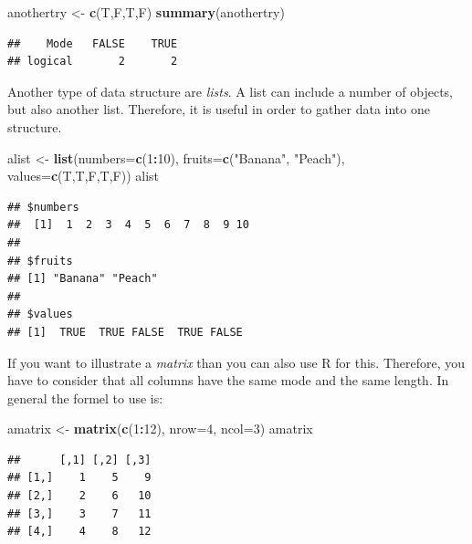 \documentclass[]{report}
\newenvironment{Shaded}{\begin{snugshade}}{\end{snugshade}}
\newcommand{\KeywordTok}[1]{\textcolor[rgb]{0.13,0.29,0.53}{\textbf{#1}}}
\newcommand{\DataTypeTok}[1]{\textcolor[rgb]{0.13,0.29,0.53}{#1}}
\newcommand{\DecValTok}[1]{\textcolor[rgb]{0.00,0.00,0.81}{#1}}
\newcommand{\StringTok}[1]{\textcolor[rgb]{0.31,0.60,0.02}{#1}}
\newcommand{\OperatorTok}[1]{\textcolor[rgb]{0.81,0.36,0.00}{\textbf{#1}}}
\newcommand{\NormalTok}[1]{#1}
\begin{document}
\begin{Shaded}
\begin{Highlighting}[]
\NormalTok{anothertry <-}\StringTok{ }\KeywordTok{c}\NormalTok{(T,F,T,F)  }
\KeywordTok{summary}\NormalTok{(anothertry)}
\end{Highlighting}
\end{Shaded}

\begin{verbatim}
##    Mode   FALSE    TRUE 
## logical       2       2
\end{verbatim}

Another type of data structure are \emph{lists}. A list can include a
number of objects, but also another list. Therefore, it is useful in
order to gather data into one structure.

\begin{Shaded}
\begin{Highlighting}[]
\NormalTok{alist <-}\StringTok{ }\KeywordTok{list}\NormalTok{(}\DataTypeTok{numbers=}\KeywordTok{c}\NormalTok{(}\DecValTok{1}\OperatorTok{:}\DecValTok{10}\NormalTok{),}
      \DataTypeTok{fruits=}\KeywordTok{c}\NormalTok{(}\StringTok{"Banana"}\NormalTok{, }\StringTok{"Peach"}\NormalTok{),}
      \DataTypeTok{values=}\KeywordTok{c}\NormalTok{(T,T,F,T,F))}
\NormalTok{alist}
\end{Highlighting}
\end{Shaded}

\begin{verbatim}
## $numbers
##  [1]  1  2  3  4  5  6  7  8  9 10
## 
## $fruits
## [1] "Banana" "Peach" 
## 
## $values
## [1]  TRUE  TRUE FALSE  TRUE FALSE
\end{verbatim}

If you want to illustrate a \emph{matrix} than you can also use R for
this. Therefore, you have to consider that all columns have the same
mode and the same length. In general the formel to use is:

\begin{Shaded}
\begin{Highlighting}[]
\NormalTok{amatrix <-}\StringTok{ }\KeywordTok{matrix}\NormalTok{(}\KeywordTok{c}\NormalTok{(}\DecValTok{1}\OperatorTok{:}\DecValTok{12}\NormalTok{), }\DataTypeTok{nrow=}\DecValTok{4}\NormalTok{, }\DataTypeTok{ncol=}\DecValTok{3}\NormalTok{) }
\NormalTok{amatrix}
\end{Highlighting}
\end{Shaded}

\begin{verbatim}
##      [,1] [,2] [,3]
## [1,]    1    5    9
## [2,]    2    6   10
## [3,]    3    7   11
## [4,]    4    8   12
\end{verbatim}
\end{document}
